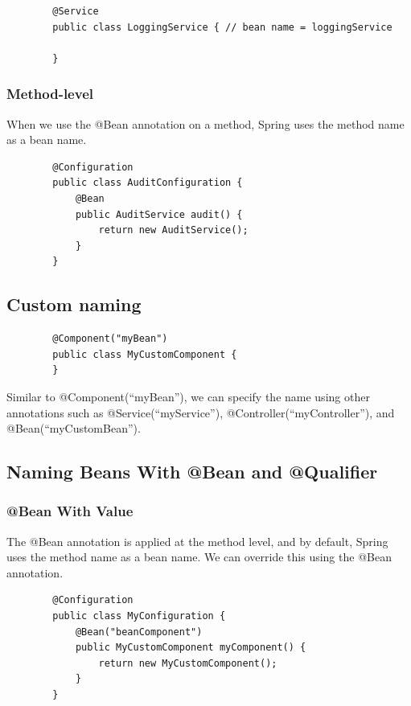 \documentclass{scrartcl}
\begin{document}
    \begin{lstlisting}
        @Service
        public class LoggingService { // bean name = loggingService

        }
    \end{lstlisting}

\subsubsection{Method-level}
When we use the @Bean annotation on a method, Spring uses the method name as a bean name.

    \begin{lstlisting}
        @Configuration
        public class AuditConfiguration {
            @Bean
            public AuditService audit() {
                return new AuditService();
            }
        }
    \end{lstlisting}

\subsection{Custom naming}

    \begin{lstlisting}
        @Component("myBean")
        public class MyCustomComponent {
        }
    \end{lstlisting}

    Similar to @Component(“myBean”), we can specify the name using other annotations such as @Service(“myService”), @Controller(“myController”), and @Bean(“myCustomBean”).

\subsection{Naming Beans With @Bean and @Qualifier}
\subsubsection{@Bean With Value}
    The @Bean annotation is applied at the method level, and by default, Spring uses the method name as a bean name. We can override this using the @Bean annotation.

     \begin{lstlisting}
        @Configuration
        public class MyConfiguration {
            @Bean("beanComponent")
            public MyCustomComponent myComponent() {
                return new MyCustomComponent();
            }
        }
    \end{lstlisting}
\end{document}
